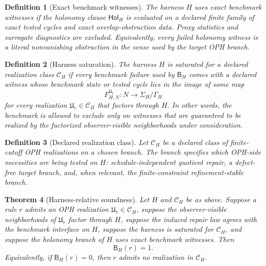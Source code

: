\documentclass[11pt]{article}
\newtheorem{theorem}{Theorem}[section]
\newtheorem{definition}[theorem]{Definition}
\theoremstyle{remark}
\theoremstyle{plain}
\begin{document}
\begin{definition}[Exact benchmark witnesses]
The harness \(H\) uses exact benchmark witnesses if the holonomy clause \(\mathsf{Hol}_H\) is evaluated on a declared finite family of exact tested cycles and exact overlap-obstruction data. Proxy statistics and surrogate diagnostics are excluded. Equivalently, every failed holonomy witness is a literal nonvanishing obstruction in the sense used by the target OPH branch.
\end{definition}

\begin{definition}[Harness saturation]
The harness \(H\) is saturated for a declared realization class \(\mathcal C_H\) if every benchmark failure used by \(\mathsf B_H\) comes with a declared witness whose benchmark state or tested cycle lies in the image of some map
\[
F^{\mathfrak U_r}_{H,N}:N\to \Sigma_H/\Gamma_H
\]
for every realization \(\mathfrak U_r\in\mathcal C_H\) that factors through \(H\). In other words, the benchmark is allowed to exclude only on witnesses that are guaranteed to be realized by the factorized observer-visible neighborhoods under consideration.
\end{definition}

\begin{definition}[Declared realization class]
Let \(\mathcal C_H\) be a declared class of finite-cutoff OPH realizations on a chosen branch. The branch specifies which OPH-side necessities are being tested on \(H\): schedule-independent quotient repair, a defect-free target branch, and, when relevant, the finite-constraint refinement-stable branch.
\end{definition}

\begin{theorem}[Harness-relative soundness]
\label{thm:soundness}
Let \(H\) and \(\mathcal C_H\) be as above. Suppose a rule \(r\) admits an OPH realization \(\mathfrak U_r\in\mathcal C_H\), suppose the observer-visible neighborhoods of \(\mathfrak U_r\) factor through \(H\), suppose the induced repair law agrees with the benchmark interface on \(H\), suppose the harness is saturated for \(\mathcal C_H\), and suppose the holonomy branch of \(H\) uses exact benchmark witnesses. Then
\[
\mathsf B_H(r)=1.
\]
Equivalently, if \(\mathsf B_H(r)=0\), then \(r\) admits no realization in \(\mathcal C_H\).
\end{theorem}
\end{document}
